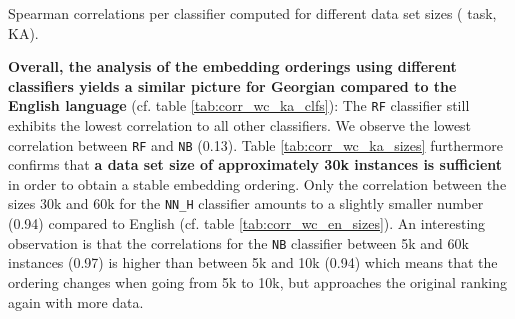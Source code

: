 

\begin{table}[h]
	\begin{minipage}{0.32\textwidth}
		
	\end{minipage}
	\hfill
	\begin{minipage}{0.32\textwidth}
		
	\end{minipage}
	\hfill
	\begin{minipage}{0.32\textwidth}
		
	\end{minipage}

	\begin{minipage}{0.49\textwidth}
		
	\end{minipage}
	\hfill
	\begin{minipage}{0.49\textwidth}
		
	\end{minipage}
	\caption[Spearman correlations per classifier for different data set sizes ( task, KA)]
		{Spearman correlations per classifier computed for different data set sizes ( task, KA).}
	\label{tab:corr_wc_ka_sizes}
\end{table}

\textbf{Overall, the analysis of the embedding orderings using different classifiers yields a similar picture for Georgian compared to the English language} (cf. table \vref{tab:corr_wc_ka_clfs}): The \texttt{RF} classifier still exhibits the lowest correlation to all other classifiers. We observe the lowest correlation between \texttt{RF} and \texttt{NB} (0.13). Table \vref{tab:corr_wc_ka_sizes} furthermore confirms that \textbf{a data set size of approximately 30k instances is sufficient} in order to obtain a stable embedding ordering. Only the correlation between the sizes 30k and 60k for the \texttt{NN\_H} classifier amounts to a slightly smaller number (0.94) compared to English (cf. table \vref{tab:corr_wc_en_sizes}). An interesting observation is that the correlations for the \texttt{NB} classifier between 5k and 60k instances (0.97) is higher than between 5k and 10k (0.94) which means that the ordering changes when going from 5k to 10k, but approaches the original ranking again with more data.

